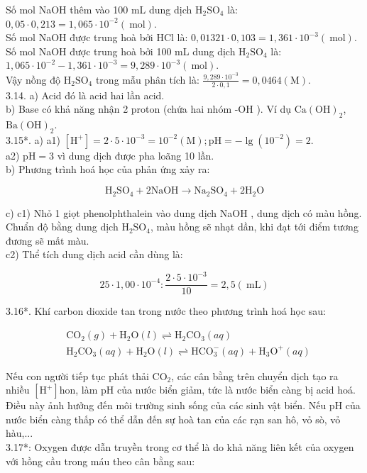 \documentclass[10pt]{article}
\begin{document}
Số mol NaOH thêm vào 100 mL dung dịch $\mathrm{H}_{2} \mathrm{SO}_{4}$ là: $0,05 \cdot 0,213=1,065 \cdot 10^{-2}(\mathrm{~mol})$.\\
Số mol NaOH được trung hoà bởi HCl là: $0,01321 \cdot 0,103=1,361 \cdot 10^{-3}(\mathrm{~mol})$.\\
Số mol NaOH được trung hoà bởi 100 mL dung dịch $\mathrm{H}_{2} \mathrm{SO}_{4}$ là:\\
$1,065 \cdot 10^{-2}-1,361 \cdot 10^{-3}=9,289 \cdot 10^{-3}(\mathrm{~mol})$.\\
Vậy nồng độ $\mathrm{H}_{2} \mathrm{SO}_{4}$ trong mẫu phân tích là: $\frac{9,289 \cdot 10^{-3}}{2 \cdot 0,1}=0,0464(\mathrm{M})$.\\
3.14. a) Acid đó là acid hai lần acid.\\
b) Base có khả năng nhận 2 proton (chứa hai nhóm -OH ). Ví dụ $\mathrm{Ca}(\mathrm{OH})_{2}$, $\mathrm{Ba}(\mathrm{OH})_{2}$.\\
3.15*. a) a1) $\left[\mathrm{H}^{+}\right]=2 \cdot 5 \cdot 10^{-3}=10^{-2}(\mathrm{M}) ; \mathrm{pH}=-\lg \left(10^{-2}\right)=2$.\\
a2) $\mathrm{pH}=3$ vì dung dịch được pha loãng 10 lần.\\
b) Phương trình hoá học của phản ứng xảy ra:

$$
\mathrm{H}_{2} \mathrm{SO}_{4}+2 \mathrm{NaOH} \rightarrow \mathrm{Na}_{2} \mathrm{SO}_{4}+2 \mathrm{H}_{2} \mathrm{O}
$$

c) c1) Nhỏ 1 giọt phenolphthalein vào dung dịch NaOH , dung dịch có màu hồng. Chuẩn độ bằng dung dịch $\mathrm{H}_{2} \mathrm{SO}_{4}$, màu hồng sẽ nhạt dần, khi đạt tới điểm tương đương sẽ mất màu.\\
c2) Thể tích dung dịch acid cần dùng là:

$$
25 \cdot 1,00 \cdot 10^{-4}: \frac{2 \cdot 5 \cdot 10^{-3}}{10}=2,5(\mathrm{~mL})
$$

3.16*. Khí carbon dioxide tan trong nước theo phương trình hoá học sau:

$$
\begin{aligned}
& \mathrm{CO}_{2}(g)+\mathrm{H}_{2} \mathrm{O}(l) \rightleftharpoons \mathrm{H}_{2} \mathrm{CO}_{3}(a q) \\
& \mathrm{H}_{2} \mathrm{CO}_{3}(a q)+\mathrm{H}_{2} \mathrm{O}(l) \rightleftharpoons \mathrm{HCO}_{3}^{-}(a q)+\mathrm{H}_{3} \mathrm{O}^{+}(a q)
\end{aligned}
$$

Nếu con người tiếp tục phát thải $\mathrm{CO}_{2}$, các cân bằng trên chuyển dịch tạo ra nhiều $\left[\mathrm{H}^{+}\right]$hon, làm pH của nước biển giảm, tức là nước biển càng bị acid hoá. Điều này ảnh hưởng đến môi trường sinh sống của các sinh vật biển. Nếu pH của nước biển càng thấp có thể dẫn đến sự hoà tan của các rạn san hô, vỏ sò, vỏ hàu,...\\
3.17*: Oxygen được dẫn truyền trong cơ thể là do khả năng liên kết của oxygen với hồng cầu trong máu theo cân bằng sau:
\end{document}
